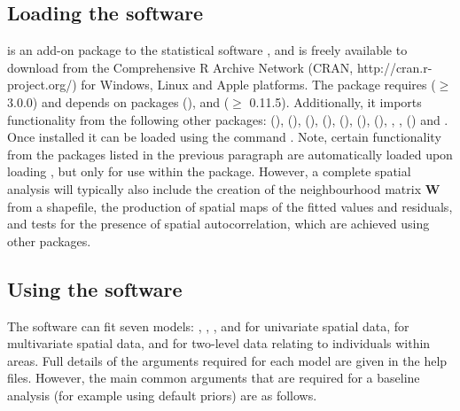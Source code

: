 \documentclass[article,shortnames,nojss]{jss}
\begin{document}
\subsection{Loading the software}
 is an add-on package to the statistical software , and is freely available to download from the Comprehensive R Archive Network (CRAN, http://cran.r-project.org/) for Windows, Linux and Apple platforms. The package requires  ($\geq$ 3.0.0) and depends on packages  (\citealp{mass2002}), and  ($\geq$ 0.11.5). Additionally, it imports functionality from the following other packages:  (\citealp{carbayesdata}),  (\citealp{coda2006}),  (\citealp{leaflet}),  (\citealp{matrixcalc}),  (\citealp{mcmcpack}),  (\citealp{spam2010}),  (\citealp{bivand2013b}), , ,  (\citealp{truncnorm2014}) and . Once installed it can be loaded using the command . Note, certain functionality from the packages listed in the previous paragraph are automatically loaded upon loading , but only for use within the package. However, a complete spatial analysis will typically also include the creation of the neighbourhood matrix $\mathbf{W}$ from a shapefile, the production of spatial maps of the fitted values and residuals, and tests for the presence of spatial autocorrelation, which are achieved using other packages.



\subsection{Using the software}
The software can fit  seven models: ,  , ,  and  for univariate spatial data,   for multivariate spatial data, and  for two-level data relating to individuals within areas. Full details of the arguments required for each model are given in the help files. However, the main common arguments that are required for a baseline analysis (for example using default priors) are as follows.
\end{document}
